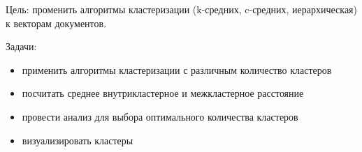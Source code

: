 
Цель: променить алгоритмы кластеризации (k-средних, c-средних, иерархическая) к векторам документов.

Задачи:
\begin{itemize}
    \item применить алгоритмы кластеризации с различным количество кластеров
    \item посчитать среднее внутрикластерное и межкластерное расстояние
    \item провести анализ для выбора оптимального количества кластеров
    \item визуализировать кластеры
\end{itemize}

\clearpage
